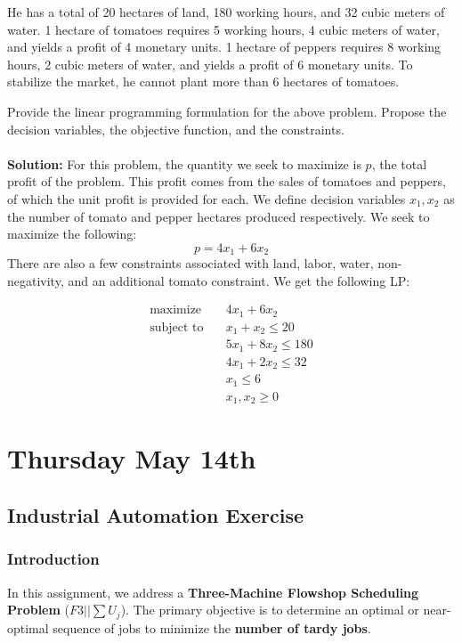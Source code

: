 \documentclass[11pt]{article}
\begin{document}
He has a total of 20 hectares of land, 180 working hours, and 32 cubic meters of water.
1 hectare of tomatoes requires 5 working hours, 4 cubic meters of water, and yields a profit of 4 monetary units.
1 hectare of peppers requires 8 working hours, 2 cubic meters of water, and yields a profit of 6 monetary units.
To stabilize the market, he cannot plant more than 6 hectares of tomatoes.

Provide the linear programming formulation for the above problem. Propose the decision variables, the objective function, and the constraints.
\\ \\
\textbf{Solution: }
For this problem, the quantity we seek to maximize is $p$, the total profit of the problem.
This profit comes from the sales of tomatoes and peppers, of which the unit profit is provided for each.
We define decision variables $x_1, x_2$ as the number of tomato and pepper hectares produced respectively.
We seek to maximize the following:
\begin{equation}
    p = 4 x_1 + 6 x_2
\end{equation}
There are also a few constraints associated with land, labor, water, non-negativity, and an additional tomato constraint.
We get the following LP:

\begin{align}
  \text{maximize} & \quad 4x_1 + 6x_2 \\
  \text{subject to} & \quad x_1 + x_2 \leq 20 \\
  & \quad 5 x_1 + 8 x_2 \leq 180 \\
  & \quad 4 x_1 + 2 x_2 \leq 32 \\
  & \quad x_1 \leq 6 \\
  & \quad x_1, x_2 \geq 0
\end{align}

\section{Thursday May 14th}
\subsection{Industrial Automation Exercise}


\subsubsection{Introduction}
In this assignment, we address a \textbf{Three-Machine Flowshop Scheduling Problem} ($F3 || \sum U_j$). The primary objective is to determine an optimal or near-optimal sequence of jobs to minimize the \textbf{number of tardy jobs}. 
\end{document}
